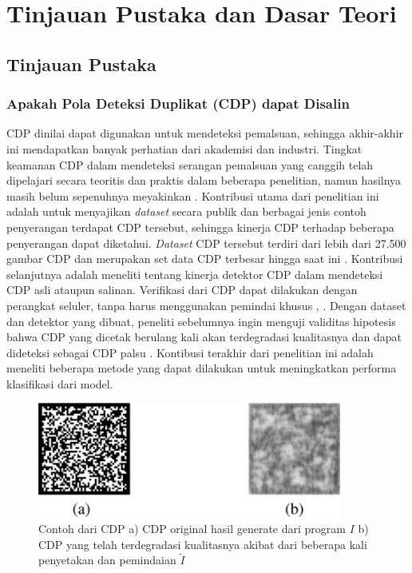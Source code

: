 \chapter{Tinjauan Pustaka dan Dasar Teori}

\section{Tinjauan Pustaka}

\subsection{Apakah Pola Deteksi Duplikat (CDP) dapat Disalin}
CDP dinilai dapat digunakan untuk mendeteksi pemalsuan, sehingga akhir-akhir ini mendapatkan banyak perhatian dari akademisi dan industri. Tingkat keamanan CDP
dalam mendeteksi serangan pemalsuan yang canggih telah dipelajari secara teoritis dan praktis dalam beberapa penelitian, namun hasilnya masih belum sepenuhnya
meyakinkan \cite{PICARDCANCOPYDETECTIONPATTERN}. Kontribusi utama dari penelitian ini adalah untuk menyajikan \emph{dataset} secara publik dan berbagai jenis
contoh penyerangan terdapat CDP tersebut, sehingga kinerja CDP terhadap beberapa penyerangan dapat diketahui. \emph{Dataset} CDP tersebut terdiri dari lebih
dari 27.500 gambar CDP dan merupakan set data CDP terbesar hingga saat ini \cite{PICARDCANCOPYDETECTIONPATTERN}. Kontribusi selanjutnya adalah meneliti tentang
kinerja detektor CDP dalam mendeteksi CDP asli ataupun salinan. Verifikasi dari CDP dapat dilakukan dengan perangkat seluler, tanpa harus menggunakan pemindai
khusus \cite{WONG2017}, \cite{SCHRAML2018REAL}. Dengan dataset dan detektor yang dibuat, peneliti sebelumnya ingin menguji validitas hipotesis bahwa CDP yang
dicetak berulang kali akan terdegradasi kualitasnya dan dapat dideteksi sebagai CDP palsu \cite{PICARDCANCOPYDETECTIONPATTERN}. Kontibusi terakhir dari
penelitian ini adalah meneliti beberapa metode yang dapat dilakukan untuk meningkatkan performa klasifikasi dari model.

\begin{figure}[htbp]
	\centering
	\includegraphics[width=10cm]{contents/chapter-2/2-cdporivsfake.png}
	\caption[Contoh dari CDP a) CDP original hasil generate dari program $I$ b) CDP yang telah terdegradasi kualitasnya akibat dari beberapa kali penyetakan dan pemindaian $\widetilde{I}$]{Contoh dari CDP a) CDP original hasil generate dari program $I$ b) CDP yang telah terdegradasi kualitasnya akibat dari beberapa kali penyetakan dan pemindaian $\widetilde{I}$ \cite{PICARDCANCOPYDETECTIONPATTERN}}
	\label{Fig: 2-cdporivsfake}
\end{figure}

